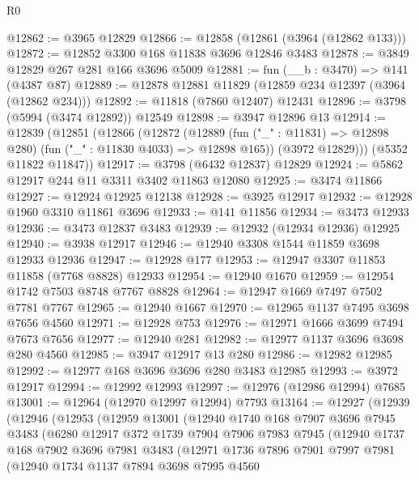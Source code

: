 \begin{lexlean}{R0}
\begin{coremodule}
@12862 := @3965 @12829
@12866 := @12858 (@12861 (@3964 (@12862 @133)))
@12872 := @12852 @3300 @168 @11838 @3696 @12846 @3483
@12878 := @3849 @12829 @267 @281 @166 @3696 @5009
@12881 := fun (__b : @3470) => @141 (@4387 @87)
@12889 := @12878 @12881 @11829 (@12859 @234 @12397 (@3964 (@12862 @234)))
@12892 := @11818 (@7860 @12407) @12431
@12896 := @3798 (@5994 (@3474 @12892)) @12549
@12898 := @3947 @12896 @13
@12914 := @12839
    (@12851
      (@12866
        (@12872
          (@12889 (fun ("_" : @11831) => @12898 @280) (fun ("_" : @11830 @4033) => @12898 @165))
          (@3972 @12829)))
      (@5352 @11822 @11847))
@12917 := @3798 (@6432 @12837) @12829
@12924 := @5862 @12917 @244 @11 @3311 @3402 @11863 @12080
@12925 := @3474 @11866
@12927 := @12924 @12925 @12138
@12928 := @3925 @12917
@12932 := @12928 @1960 @3310 @11861 @3696
@12933 := @141 @11856
@12934 := @3473 @12933
@12936 := @3473 @12837 @3483
@12939 := @12932 (@12934 @12936) @12925
@12940 := @3938 @12917
@12946 := @12940 @3308 @1544 @11859 @3698 @12933 @12936
@12947 := @12928 @177
@12953 := @12947 @3307 @11853 @11858 (@7768 @8828) @12933
@12954 := @12940 @1670
@12959 := @12954 @1742 @7503 @8748 @7767 @8828
@12964 := @12947 @1669 @7497 @7502 @7781 @7767
@12965 := @12940 @1667
@12970 := @12965 @1137 @7495 @3698 @7656 @4560
@12971 := @12928 @753
@12976 := @12971 @1666 @3699 @7494 @7673 @7656
@12977 := @12940 @281
@12982 := @12977 @1137 @3696 @3698 @280 @4560
@12985 := @3947 @12917 @13 @280
@12986 := @12982 @12985
@12992 := @12977 @168 @3696 @3696 @280 @3483 @12985
@12993 := @3972 @12917
@12994 := @12992 @12993
@12997 := @12976 (@12986 @12994) @7685
@13001 := @12964 (@12970 @12997 @12994) @7793
@13164 := @12927
    (@12939
      (@12946
        (@12953
          (@12959
            @13001
            (@12940
              @1740
              @168
              @7907
              @3696
              @7945
              @3483
              (@6280
                @12917
                @372
                @1739
                @7904
                @7906
                @7983
                @7945
                (@12940
                  @1737
                  @168
                  @7902
                  @3696
                  @7981
                  @3483
                  (@12971
                    @1736
                    @7896
                    @7901
                    @7997
                    @7981
                    (@12940
                      @1734
                      @1137
                      @7894
                      @3698
                      @7995
                      @4560

\end{coremodule}
\end{lexlean}
